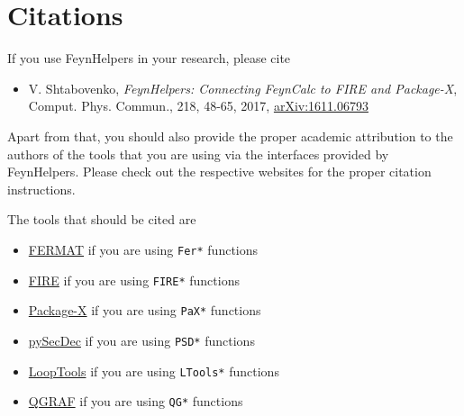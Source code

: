 \documentclass[../FeynHelpersManual.tex]{subfiles}
\begin{document}
\hypertarget{citations}{
\section{Citations}\label{citations}}

If you use FeynHelpers in your research, please cite

\begin{itemize}
\tightlist
\item
  V. Shtabovenko, \emph{FeynHelpers: Connecting FeynCalc to FIRE and
  Package-X}, Comput. Phys. Commun., 218, 48-65, 2017,
  \href{https://arxiv.org/abs/1611.06793}{arXiv:1611.06793}
\end{itemize}

Apart from that, you should also provide the proper academic attribution
to the authors of the tools that you are using via the interfaces
provided by FeynHelpers. Please check out the respective websites for
the proper citation instructions.

The tools that should be cited are

\begin{itemize}
\item
  \href{https://home.bway.net/lewis/}{FERMAT} if you are using
  \texttt{Fer*} functions
\item
  \href{https://bitbucket.org/feynmanIntegrals/fire/}{FIRE} if you are
  using \texttt{FIRE*} functions
\item
  \href{https://packagex.hepforge.org/}{Package-X} if you are using
  \texttt{PaX*} functions
\item
  \href{https://secdec.readthedocs.io/en/stable/}{pySecDec} if you are
  using \texttt{PSD*} functions
\item
  \href{http://www.feynarts.de/looptools/}{LoopTools} if you are using
  \texttt{LTools*} functions
\item
  \href{http://cfif.ist.utl.pt/~paulo/qgraf.html}{QGRAF} if you are
  using \texttt{QG*} functions
\end{itemize}
\end{document}
